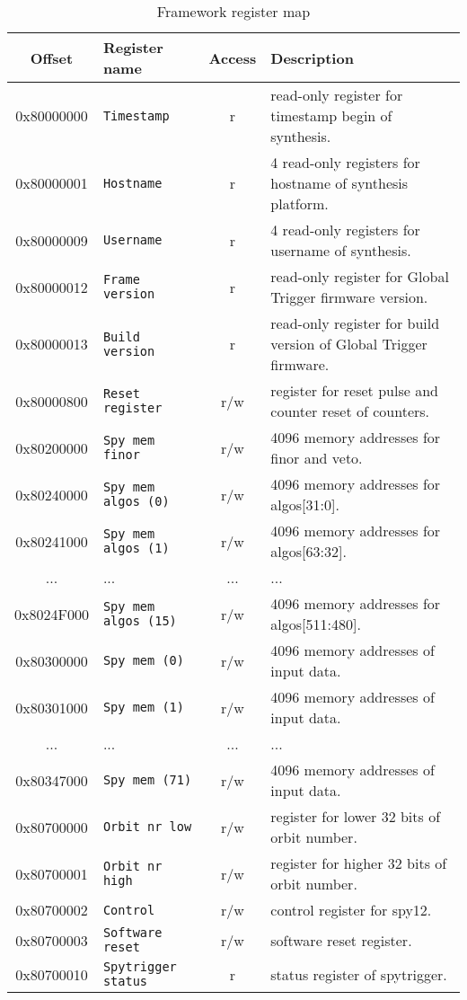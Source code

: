 \begin{longtable}{c p{} c p{}}
\caption{Framework register map}\\
\hline
Offset & {Register name} & {Access} & {Description}\\
\hline
\hline
\endhead
0x80000000 & \verb|Timestamp| & r & read-only register for timestamp begin of synthesis.\\
0x80000001 & \verb|Hostname| & r & 4 read-only registers for hostname of synthesis platform.\\
0x80000009 & \verb|Username| & r & 4 read-only registers for username of synthesis.\\
0x80000012 & \verb|Frame version| & r & read-only register for Global Trigger firmware version.\\
0x80000013 & \verb|Build version| & r & read-only register for build version of Global Trigger firmware.\\
0x80000800 & \verb|Reset register| & r/w & register for reset pulse and counter reset of counters.\\
0x80200000 & \verb|Spy mem finor| & r/w & 4096 memory addresses for finor and veto.\\
0x80240000 & \verb|Spy mem algos (0)| & r/w & 4096 memory addresses for algos[31:0].\\
0x80241000 & \verb|Spy mem algos (1)| & r/w & 4096 memory addresses for algos[63:32].\\
... & ... & ... & ...\\
0x8024F000 & \verb|Spy mem algos (15)| & r/w & 4096 memory addresses for algos[511:480].\\
0x80300000 & \verb|Spy mem (0)| & r/w & 4096 memory addresses of input data.\\
0x80301000 & \verb|Spy mem (1)| & r/w & 4096 memory addresses of input data.\\
... & ... & ... & ...\\
0x80347000 & \verb|Spy mem (71)| & r/w & 4096 memory addresses of input data.\\
0x80700000 & \verb|Orbit nr low| & r/w & register for lower 32 bits of orbit number.\\
0x80700001 & \verb|Orbit nr high| & r/w & register for higher 32 bits of orbit number.\\
0x80700002 & \verb|Control| & r/w & control register for spy12.\\
0x80700003 & \verb|Software reset| & r/w & software reset register.\\
0x80700010 & \verb|Spytrigger status| & r & status register of spytrigger.\\

\end{longtable}
